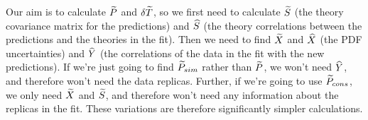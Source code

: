 Our aim is to calculate $\widetilde{P}$ and $\delta \widetilde{T}$, so we first need to calculate $\widetilde{S}$ (the theory covariance matrix for the predictions) and $\widehat{S}$ (the theory correlations between the predictions and the theories in the fit). Then we need to find $\widetilde{X}$ and $\widehat{X}$ (the PDF uncertainties) and $\widehat{Y}$ (the correlations of the data in the fit with the new predictions). If we're just going to find $\widetilde{P}_{sim}$ rather than $\widetilde{P}$, we won't need $\widehat{Y}$, and therefore won't need the data replicas. Further, if we're going to use $\widetilde{P}_{cons}$, we only need $\widetilde{X}$ and $\widetilde{S}$, and therefore won't need any information about the replicas in the fit. These variations are therefore significantly simpler calculations.
\begin{figure}[t!]
    \begin{center}
    \end{center}
  \vspace{-0.55cm}

\end{figure}

